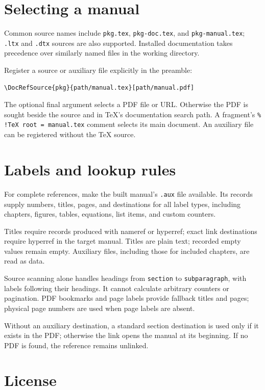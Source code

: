 \documentclass{article}
\begin{document}
\section{Selecting a manual}
Common source names include \texttt{pkg.tex}, \texttt{pkg-doc.tex}, and
\texttt{pkg-manual.tex}; \texttt{.ltx} and \texttt{.dtx} sources are also
supported. Installed documentation takes precedence over similarly named
files in the working directory.

Register a source or auxiliary file explicitly in the preamble:
\begin{verbatim}
\DocRefSource{pkg}{path/manual.tex}[path/manual.pdf]
\end{verbatim}
The optional final argument selects a PDF file or URL. Otherwise the PDF
is sought beside the source and in TeX's documentation search path.
A fragment's \verb|% !TeX root = manual.tex| comment selects its main
document. An auxiliary file can be registered without the TeX source.

\section{Labels and lookup rules}
For complete references, make the built manual's \texttt{.aux} file
available. Its records supply numbers, titles, pages, and destinations for
all label types, including chapters, figures, tables, equations, list items,
and custom counters.

Titles require records produced with \textsf{nameref} or \textsf{hyperref};
exact link destinations require \textsf{hyperref} in the target manual.
Titles are plain text; recorded empty values remain empty. Auxiliary files,
including those for included chapters, are read as data.

Source scanning alone handles headings from \texttt{section} to
\texttt{subparagraph}, with labels following their headings.
It cannot calculate arbitrary counters or pagination. PDF bookmarks and
page labels provide fallback titles and pages; physical page numbers are
used when page labels are absent.

Without an auxiliary destination, a standard section destination is used
only if it exists in the PDF; otherwise the link opens the manual at its
beginning. If no PDF is found, the reference remains unlinked.

\section{License}
\end{document}
